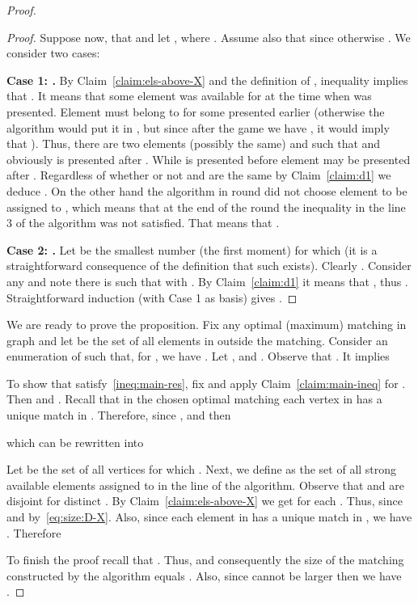 \documentclass[12pt]{amsart}
\theoremstyle{definition}
\begin{document}
\begin{proof}
\begin{proof}
Suppose now, that  and let , where . 
Assume also that  since otherwise .
We consider two cases:

\textbf{Case 1: .}
By Claim~\ref{claim:els-above-X} and the definition of , inequality  implies that .
It  means that some element  was available for  at the time when  was presented. 
Element  must belong to  for some  presented earlier 
(otherwise the algorithm would put it in , but since after the game we have  , it would  imply that ). 
Thus, there are two elements (possibly the same)  and  such that  and obviously  is presented after .
While  is presented before  element  may be presented after .
Regardless of whether or not  and  are the same
by Claim~\ref{claim:d1} we deduce . 
On the other hand the algorithm in round   did not choose element  to be assigned to , which means that at the end of the round the inequality in the line 3 of the algorithm was not satisfied. 
That means that .

\textbf{Case 2: .} 
Let  be the smallest number (the first moment) for which  (it is a straightforward consequence of the definition that such  exists). 
Clearly  . 
Consider any  and note there is  such that  with . 
By Claim~\ref{claim:d1} it means that , thus . 
Straightforward induction (with Case 1 as basis) gives .
\end{proof}

We are ready to prove the proposition. 
Fix any optimal (maximum) matching in graph  and let  be the set of all elements in  outside the  matching. 
Consider an enumeration  of   such that, for  , we have . 
Let ,  and .
Observe that . 
It implies


To show that  satisfy~\eqref{ineq:main-res}, fix  and apply Claim~\ref{claim:main-ineq} for .  
Then  and  . 
Recall that in the chosen optimal matching each vertex in  has a unique match in .
Therefore,  
since ,
and then
 
which  can be  rewritten into

Let  be the set of all vertices  for which . 
Next, we define  as the set of all strong available elements assigned to  in the line  of the algorithm. 
Observe that  and  are disjoint for distinct . 
By Claim~\ref{claim:els-above-X} we get  for each . 
Thus,  since  and by~\eqref{eq:size:D-X}.
Also, since each element in  has a unique match in , we have .  Therefore



To finish the proof recall that .
Thus,  and consequently the size of the matching constructed by the algorithm equals .
Also, since  cannot be larger then  we have .
\end{proof}
\end{document}
